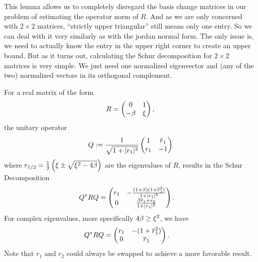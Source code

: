 This lemma allows us to completely disregard the basis change matrices  in our
problem of estimating the operator norm of \(R\). And as we are only concerned
with \(2\times 2\) matrices, ``strictly upper triangular'' still means only one
entry. So we can deal with it very similarly as with the jordan normal form. The
only issue is, we need to actually know the entry in the upper right corner to
create an upper bound. But as it turns out, calculating the Schur decomposition
for \(2\times 2\) matrices is very simple. We just need one normalized
eigenvector and (any of the two) normalized vectors in its orthogonal
complement.

\begin{lemma}
	\label{lem: explicit schur decomposition}
	For a real matrix of the form
	\begin{align*}
		R = \begin{pmatrix}
			0 & 1 \\
			-\beta & \xi
		\end{pmatrix},
	\end{align*}
	the unitary operator	
	\begin{align*}
		Q:=\frac{1}{\sqrt{1+|r_1|^2}} \begin{pmatrix}
		1 & \overline{r}_1 \\
		r_1 & -1
	\end{pmatrix}
	\end{align*}
	where
	\(
		r_{1/2}
		= \tfrac12 \left(
			\xi \pm \sqrt{\xi^2 - 4\beta}
		\right)
	\)
	are the eigenvalues of \(R\), results in the Schur Decomposition
	\begin{align*}
		Q^* R Q
		&=\begin{pmatrix}
			r_1
			& -\frac{(1+\beta)(1+\overline{r}_1^2)}{1+|r_1|^2} \\
			0 &  \frac{\beta\overline{r}_1 + r_2}{1+|r_1|^2}
		\end{pmatrix}.
	\end{align*}
	For complex eigenvalues, more specifically \(4\beta\ge\xi^2\), we have
	\begin{align*}
		Q^* R Q
		&=\begin{pmatrix}
			r_1
			& -(1+\overline{r}_1^2) \\
			0 & \overline{r}_1 
		\end{pmatrix}.
	\end{align*}
	Note that \(r_1\) and \(r_2\) could always be swapped to achieve a more favorable result.
\end{lemma}
